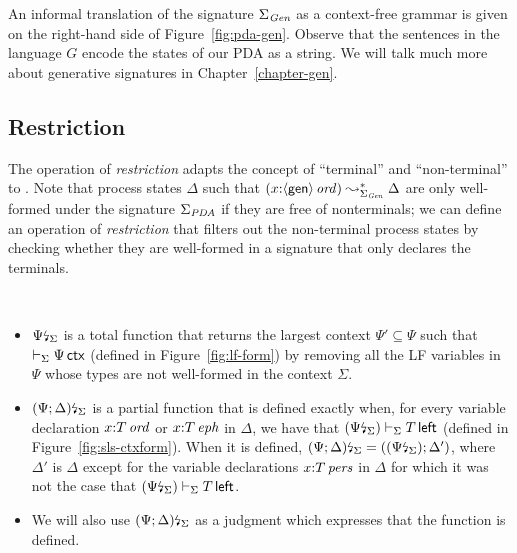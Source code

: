 An informal translation of the signature $\Sigma_{\it Gen}$ as a
context-free grammar is given on the right-hand side of
Figure~\ref{fig:pda-gen}. Observe that the sentences in the language
$G$ encode the states of our PDA as a string. We will talk much more
about generative signatures in Chapter~\ref{chapter-gen}.

\subsection{Restriction}
\label{sec:framework-restriction}

The operation of {\it restriction} adapts the concept of ``terminal''
and ``non-terminal'' to \sls. Note that process states $\Delta$
such that $(x{:}{\langle {\sf gen} \rangle}\,{{\it ord}}) \leadsto^*_{\Sigma_{\it Gen}}
\Delta$ are only well-formed under the signature $\Sigma_{\it PDA}$ if
they are free of nonterminals; we can define an operation of {\it
  restriction} that filters out the non-terminal process states by
checking whether they are well-formed in a signature that only
declares the terminals.

\bigskip
\begin{definition}[Restriction]~
\begin{itemize}
\item
  ${\Psi}{\mbox{\lightning}}_{\Sigma}$ is a total function that returns the
  largest context $\Psi' \subseteq \Psi$ such that $\vdash_\Sigma
  \Psi\,{\sf ctx}$ (defined in Figure~\ref{fig:lf-form}) by removing
  all the LF variables in $\Psi$ whose types are not well-formed in
  the context $\Sigma$.

\item
  ${(\Psi; \Delta)}{\mbox{\lightning}}_{\Sigma}$ is a partial function that is
  defined exactly when, for every variable declaration
  $x{:}{T}\,{{\it ord}}$ or $x{:}{T}\,{{\it eph}}$ in $\Delta$, we have that
  $({\Psi}{\mbox{\lightning}}_{\Sigma}) \vdash_\Sigma T\,{\sf left}$ (defined
  in Figure~\ref{fig:sls-ctxform}). When it is defined,
  ${(\Psi; \Delta)}{\mbox{\lightning}}_{\Sigma} = (({\Psi}{\mbox{\lightning}}_{\Sigma});
  \Delta')$, where $\Delta'$ is $\Delta$ except for the variable
  declarations $x{:}{T}\,{{\it pers}}$ in $\Delta$ for which it was not the
  case that $({\Psi}{\mbox{\lightning}}_{\Sigma}) \vdash_\Sigma T\,{\sf
    left}$.

\item
  We will also use ${(\Psi; \Delta)}{\mbox{\lightning}}_{\Sigma}$ as a
  judgment which expresses that the function is defined.

\end{itemize}
\end{definition}
\bigskip

